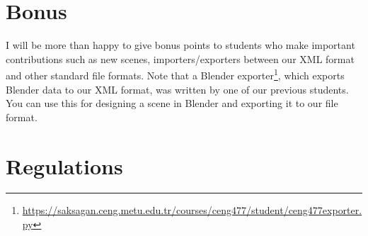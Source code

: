 \documentclass[12pt]{article}
\begin{document}
\section{Bonus}

I will be more than happy to give bonus points to students who
make important contributions such as new scenes, importers/exporters
between our XML format and other standard file formats. Note that a
Blender
exporter\footnote{\url{https://saksagan.ceng.metu.edu.tr/courses/ceng477/student/ceng477exporter.py}},
which exports Blender data to our XML format, was written by one of our
previous students. You can use this for designing a scene in Blender and
exporting it to our file format.

\section{Regulations}
\end{document}
